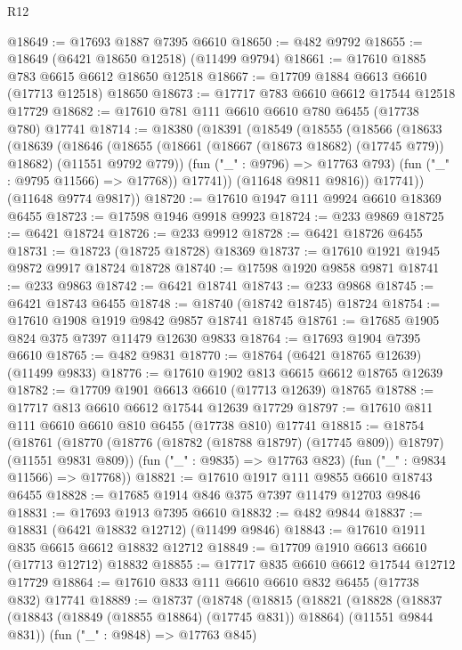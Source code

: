 \begin{lexlean}{R12}
\begin{coremodule}
{{{{{{{{{{{{{{{{{{{{{{{{{{{{{{{{{{{{{{{{{{{{{{{{{{{{{{{{{{{{{{{{{{{{{{{{{{{{{{{{{{@18649 := @17693 @1887 @7395 @6610
@18650 := @482 @9792
@18655 := @18649 (@6421 @18650 @12518) (@11499 @9794)
@18661 := @17610 @1885 @783 @6615 @6612 @18650 @12518
@18667 := @17709 @1884 @6613 @6610 (@17713 @12518) @18650
@18673 := @17717 @783 @6610 @6612 @17544 @12518 @17729
@18682 := @17610 @781 @111 @6610 @6610 @780 @6455 (@17738 @780) @17741
@18714 := @18380
    (@18391
      (@18549
        (@18555
          (@18566
            (@18633
              (@18639
                (@18646
                  (@18655
                    (@18661 (@18667 (@18673 @18682) (@17745 @779)) @18682)
                    (@11551 @9792 @779))
                  (fun ("_" : @9796) => @17763 @793)
                  (fun ("_" : @9795 @11566) => @17768))
                @17741))
            (@11648 @9811 @9816))
          @17741))
      (@11648 @9774 @9817))
@18720 := @17610 @1947 @111 @9924 @6610 @18369 @6455
@18723 := @17598 @1946 @9918 @9923
@18724 := @233 @9869
@18725 := @6421 @18724
@18726 := @233 @9912
@18728 := @6421 @18726 @6455
@18731 := @18723 (@18725 @18728) @18369
@18737 := @17610 @1921 @1945 @9872 @9917 @18724 @18728
@18740 := @17598 @1920 @9858 @9871
@18741 := @233 @9863
@18742 := @6421 @18741
@18743 := @233 @9868
@18745 := @6421 @18743 @6455
@18748 := @18740 (@18742 @18745) @18724
@18754 := @17610 @1908 @1919 @9842 @9857 @18741 @18745
@18761 := @17685 @1905 @824 @375 @7397 @11479 @12630 @9833
@18764 := @17693 @1904 @7395 @6610
@18765 := @482 @9831
@18770 := @18764 (@6421 @18765 @12639) (@11499 @9833)
@18776 := @17610 @1902 @813 @6615 @6612 @18765 @12639
@18782 := @17709 @1901 @6613 @6610 (@17713 @12639) @18765
@18788 := @17717 @813 @6610 @6612 @17544 @12639 @17729
@18797 := @17610 @811 @111 @6610 @6610 @810 @6455 (@17738 @810) @17741
@18815 := @18754
    (@18761
      (@18770 (@18776 (@18782 (@18788 @18797) (@17745 @809)) @18797) (@11551 @9831 @809))
      (fun ("_" : @9835) => @17763 @823)
      (fun ("_" : @9834 @11566) => @17768))
@18821 := @17610 @1917 @111 @9855 @6610 @18743 @6455
@18828 := @17685 @1914 @846 @375 @7397 @11479 @12703 @9846
@18831 := @17693 @1913 @7395 @6610
@18832 := @482 @9844
@18837 := @18831 (@6421 @18832 @12712) (@11499 @9846)
@18843 := @17610 @1911 @835 @6615 @6612 @18832 @12712
@18849 := @17709 @1910 @6613 @6610 (@17713 @12712) @18832
@18855 := @17717 @835 @6610 @6612 @17544 @12712 @17729
@18864 := @17610 @833 @111 @6610 @6610 @832 @6455 (@17738 @832) @17741
@18889 := @18737
    (@18748
      (@18815
        (@18821
          (@18828
            (@18837 (@18843 (@18849 (@18855 @18864) (@17745 @831)) @18864) (@11551 @9844 @831))
            (fun ("_" : @9848) => @17763 @845)
}}}}}}}}}}}}}}}}}}}}}}}}}}}}}}}}}}}}}}}}}}}}}}}}}}}}}}}}}}}}}}}}}}}}}}}}}}}}}}}}}}
\end{coremodule}
\end{lexlean}
